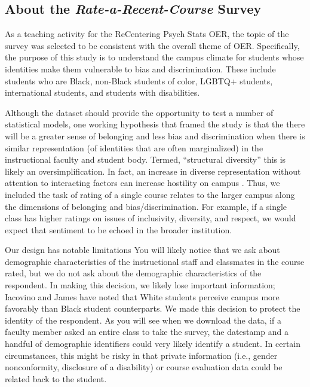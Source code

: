 \documentclass[
]{book}
\begin{document}
\hypertarget{about-the-rate-a-recent-course-survey}{%
\subsection{\texorpdfstring{About the \emph{Rate-a-Recent-Course} Survey}{About the Rate-a-Recent-Course Survey}}\label{about-the-rate-a-recent-course-survey}}

As a teaching activity for the ReCentering Psych Stats OER, the topic of the survey was selected to be consistent with the overall theme of OER. Specifically, the purpose of this study is to understand the campus climate for students whose identities make them vulnerable to bias and discrimination. These include students who are Black, non-Black students of color, LGBTQ+ students, international students, and students with disabilities.

Although the dataset should provide the opportunity to test a number of statistical models, one working hypothesis that framed the study is that the there will be a greater sense of belonging and less bias and discrimination when there is similar representation (of identities that are often marginalized) in the instructional faculty and student body. Termed, ``structural diversity'' \citep{lewis_black_2019} this is likely an oversimplification. In fact, an increase in diverse representation without attention to interacting factors can increase hostility on campus \citep{hurtado_linking_2007}. Thus, we included the task of rating of a single course relates to the larger campus along the dimensions of belonging and bias/discrimination. For example, if a single class has higher ratings on issues of inclusivity, diversity, and respect, we would expect that sentiment to be echoed in the broader institution.

Our design has notable limitations You will likely notice that we ask about demographic characteristics of the instructional staff and classmates in the course rated, but we do not ask about the demographic characteristics of the respondent. In making this decision, we likely lose important information; Iacovino and James \citeyearpar{iacovino_retaining_2016} have noted that White students perceive campus more favorably than Black student counterparts. We made this decision to protect the identity of the respondent. As you will see when we download the data, if a faculty member asked an entire class to take the survey, the datestamp and a handful of demographic identifiers could very likely identify a student. In certain circumstances, this might be risky in that private information (i.e., gender nonconformity, disclosure of a disability) or course evaluation data could be related back to the student.
\end{document}
